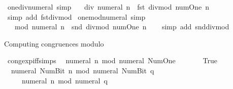 \begin{isabellebody}
\isanewline
%
\endisadelimproof
\isanewline
{}\isamarkupfalse%
\ one{\isacharunderscore}{\kern0pt}div{\isacharunderscore}{\kern0pt}numeral\ {\isacharbrackleft}{\kern0pt}simp{\isacharbrackright}{\kern0pt}{\isacharcolon}{\kern0pt}\isanewline
\ \ {\isachardoublequoteopen}{}\ div\ numeral\ n\ {\isacharequal}{\kern0pt}\ fst\ {\isacharparenleft}{\kern0pt}divmod\ num{\isachardot}{\kern0pt}One\ n{\isacharparenright}{\kern0pt}{\isachardoublequoteclose}\isanewline
%
\isadelimproof
\ \ %
\endisadelimproof
%
\isatagproof
{}\isamarkupfalse%
\ {\isacharparenleft}{\kern0pt}simp\ add{\isacharcolon}{\kern0pt}\ fst{\isacharunderscore}{\kern0pt}divmod{\isacharparenright}{\kern0pt}%
\endisatagproof
{\isafoldproof}%
%
\isadelimproof
\isanewline
%
\endisadelimproof
\isanewline
{}\isamarkupfalse%
\ one{\isacharunderscore}{\kern0pt}mod{\isacharunderscore}{\kern0pt}numeral\ {\isacharbrackleft}{\kern0pt}simp{\isacharbrackright}{\kern0pt}{\isacharcolon}{\kern0pt}\isanewline
\ \ {\isachardoublequoteopen}{}\ mod\ numeral\ n\ {\isacharequal}{\kern0pt}\ snd\ {\isacharparenleft}{\kern0pt}divmod\ num{\isachardot}{\kern0pt}One\ n{\isacharparenright}{\kern0pt}{\isachardoublequoteclose}\isanewline
%
\isadelimproof
\ \ %
\endisadelimproof
%
\isatagproof
{}\isamarkupfalse%
\ {\isacharparenleft}{\kern0pt}simp\ add{\isacharcolon}{\kern0pt}\ snd{\isacharunderscore}{\kern0pt}divmod{\isacharparenright}{\kern0pt}%
\endisatagproof
{\isafoldproof}%
%
\isadelimproof
%
\endisadelimproof
%
\begin{isamarkuptext}%
Computing congruences modulo %
\end{isamarkuptext}\isamarkuptrue%
\isamarkupfalse%
\ cong{\isacharunderscore}{\kern0pt}exp{\isacharunderscore}{\kern0pt}iff{\isacharunderscore}{\kern0pt}simps{\isacharcolon}{\kern0pt}\isanewline
\ \ {\isachardoublequoteopen}numeral\ n\ mod\ numeral\ Num{\isachardot}{\kern0pt}One\ {\isacharequal}{\kern0pt}\ {}\isanewline
\ \ \ \ {\isasymlongleftrightarrow}\ True{\isachardoublequoteclose}\isanewline
\ \ {\isachardoublequoteopen}numeral\ {\isacharparenleft}{\kern0pt}Num{\isachardot}{\kern0pt}Bit{}\ n{\isacharparenright}{\kern0pt}\ mod\ numeral\ {\isacharparenleft}{\kern0pt}Num{\isachardot}{\kern0pt}Bit{}\ q{\isacharparenright}{\kern0pt}\ {\isacharequal}{\kern0pt}\ {}\isanewline
\ \ \ \ {\isasymlongleftrightarrow}\ numeral\ n\ mod\ numeral\ q\ {\isacharequal}{\kern0pt}\ {}{\isachardoublequoteclose}\isanewline

\end{isabellebody}
